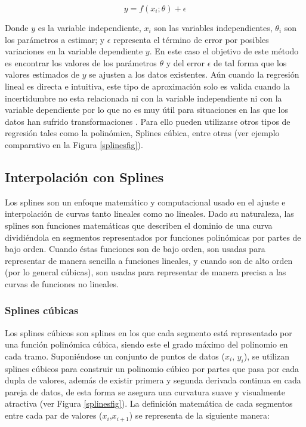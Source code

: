 \begin{equation}
    y = f(x_{i};\theta) + \epsilon
\end{equation}

Donde $y$ es la variable independiente, $x_{i}$ son las variables independientes, $\theta_{i}$ son los parámetros a estimar; y $\epsilon$ representa el término de error por posibles variaciones en la variable dependiente $y$. En este caso el objetivo de este método es encontrar los valores de los parámetros $\theta$ y del error $\epsilon$ de tal forma que los valores estimados de $y$ se ajusten a los datos existentes. Aún cuando la regresión lineal es directa e intuitiva, este tipo de aproximación solo es valida cuando la incertidumbre no esta relacionada ni con la variable independiente ni con la variable dependiente por lo que no es muy útil para situaciones en las que los datos han sufrido transformaciones \cite{nlreg}. Para ello pueden utilizarse otros tipos de regresión tales como la polinómica, Splines cúbica, entre otras (ver ejemplo comparativo en la Figura \ref{splinesfig}).

\subsection{Interpolación con Splines}
Los splines son un enfoque matemático y computacional usado en el ajuste e interpolación de curvas tanto lineales como no lineales. Dado su naturaleza, las splines son funciones matemáticas que describen el dominio de una curva dividiéndola en segmentos representados por funciones polinómicas por partes de bajo orden. Cuando éstas funciones son de bajo orden, son usadas para representar de manera sencilla a funciones lineales, y cuando son de alto orden (por lo general cúbicas), son usadas para representar de manera precisa a las curvas de funciones no lineales.

\subsubsection{Splines cúbicas}\label{splinescub}

Los splines cúbicos son splines en los que cada segmento está representado por una función polinómica cúbica, siendo este el grado máximo del polinomio en cada tramo. Suponiéndose un conjunto de puntos de datos ($x_{i}$, $y_{i}$), se utilizan splines cúbicos para construir un polinomio cúbico por partes que pasa por cada dupla de valores, además de existir primera y segunda derivada continua en cada pareja de datos, de esta forma se asegura una curvatura suave y visualmente atractiva (ver Figura \ref{splinesfig}). La definición matemática de cada segmentos entre cada par de valores ($x_{i}$,$x_{i+1}$) se representa de la siguiente manera:

